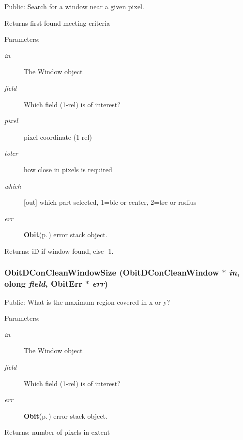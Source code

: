 Public: Search for a window near a given pixel. 

Returns first found meeting criteria \begin{Desc}
\item[Parameters:]
\begin{description}
\item[{\em in}]The Window object \item[{\em field}]Which field (1-rel) is of interest? \item[{\em pixel}]pixel coordinate (1-rel) \item[{\em toler}]how close in pixels is required \item[{\em which}][out] which part selected, 1=blc or center, 2=trc or radius \item[{\em err}]{\bf Obit}{\rm (p.\,\pageref{structObit})} error stack object. \end{description}
\end{Desc}
\begin{Desc}
\item[Returns:]i\-D if window found, else -1. \end{Desc}
\subsubsection{ Obit\-DCon\-Clean\-Window\-Size ({\bf Obit\-DCon\-Clean\-Window} $\ast$ {\em in}, {\bf olong} {\em field}, {\bf Obit\-Err} $\ast$ {\em err})}\label{ObitDConCleanWindow_8h_a43}


Public: What is the maximum region covered in x or y? 

\begin{Desc}
\item[Parameters:]
\begin{description}
\item[{\em in}]The Window object \item[{\em field}]Which field (1-rel) is of interest? \item[{\em err}]{\bf Obit}{\rm (p.\,\pageref{structObit})} error stack object. \end{description}
\end{Desc}
\begin{Desc}
\item[Returns:]number of pixels in extent \end{Desc}
